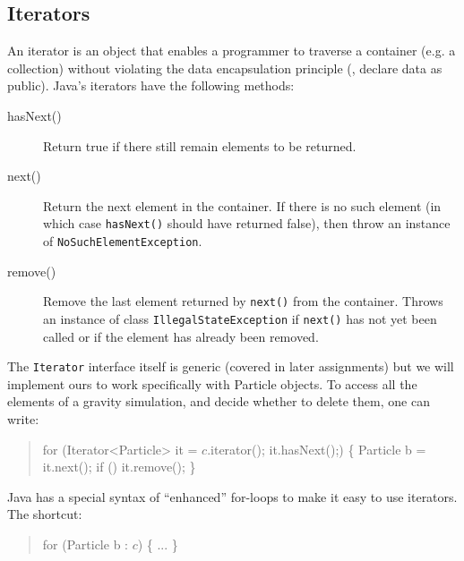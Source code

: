 \subsection{Iterators}
An iterator is an object that enables a programmer 
to traverse a container (e.g. a collection) without violating the
data encapsulation principle (\ie, declare data as public).
Java's iterators have the following methods:
\begin{description}
\item[hasNext()] Return true if there still remain elements to be returned.
\item[next()] Return the next element in the container.  If there is
  no such element (in which case \verb|hasNext()| should have returned
  false), then throw an instance of \verb|NoSuchElementException|.
\item[remove()] Remove the last element returned by \verb|next()| from
  the container.  Throws an instance of class \verb|IllegalStateException| if
  \verb|next()| has not yet been called or if the element has already
  been removed.
\end{description}
The \verb|Iterator| interface itself is generic (covered in later assignments) but we will
implement ours to work specifically with \textsf{Particle} objects.
To access all the elements of a gravity simulation, and decide whether to
delete them, one can write:
\begin{quote}
\begin{htmlonly}
\begin{alltt}
\end{htmlonly}
%begin{latexonly}
\begin{program}
%end{latexonly}
for (Iterator<Particle> it = $c$.iterator(); it.hasNext();) \{
   Particle b = it.next();
   if () it.remove();
\}
%begin{latexonly}
\end{program}
%end{latexonly}
\begin{htmlonly}
\end{alltt}
\end{htmlonly}
\end{quote}
Java has a special syntax of ``enhanced'' for-loops to make it easy to use
iterators.  The shortcut:
\begin{quote}
\begin{htmlonly}
\begin{alltt}
\end{htmlonly}
%begin{latexonly}
\begin{program}
%end{latexonly}
for (Particle b : $c$) \{
   ...
\}
%begin{latexonly}
\end{program}
%end{latexonly}
\begin{htmlonly}
\end{alltt}
\end{htmlonly}
\end{quote}
